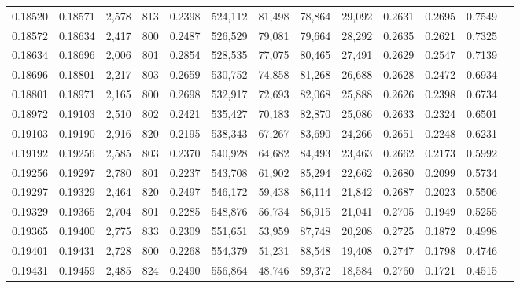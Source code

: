 \begin{tabular}{rrrrrrrrrrrrr}
0.18520 & 0.18571 &  2,578 & 813 &                                     0.2398 & 524,112 &  81,498 &  78,864 &  29,092 & 0.2631 & 0.2695 & 0.7549 \\
0.18572 & 0.18634 &  2,417 & 800 &                                     0.2487 & 526,529 &  79,081 &  79,664 &  28,292 & 0.2635 & 0.2621 & 0.7325 \\
0.18634 & 0.18696 &  2,006 & 801 &                                     0.2854 & 528,535 &  77,075 &  80,465 &  27,491 & 0.2629 & 0.2547 & 0.7139 \\
0.18696 & 0.18801 &  2,217 & 803 &                                     0.2659 & 530,752 &  74,858 &  81,268 &  26,688 & 0.2628 & 0.2472 & 0.6934 \\
0.18801 & 0.18971 &  2,165 & 800 &                                     0.2698 & 532,917 &  72,693 &  82,068 &  25,888 & 0.2626 & 0.2398 & 0.6734 \\
0.18972 & 0.19103 &  2,510 & 802 &                                     0.2421 & 535,427 &  70,183 &  82,870 &  25,086 & 0.2633 & 0.2324 & 0.6501 \\
0.19103 & 0.19190 &  2,916 & 820 &                                     0.2195 & 538,343 &  67,267 &  83,690 &  24,266 & 0.2651 & 0.2248 & 0.6231 \\
0.19192 & 0.19256 &  2,585 & 803 &                                     0.2370 & 540,928 &  64,682 &  84,493 &  23,463 & 0.2662 & 0.2173 & 0.5992 \\
0.19256 & 0.19297 &  2,780 & 801 &                                     0.2237 & 543,708 &  61,902 &  85,294 &  22,662 & 0.2680 & 0.2099 & 0.5734 \\
0.19297 & 0.19329 &  2,464 & 820 &                                     0.2497 & 546,172 &  59,438 &  86,114 &  21,842 & 0.2687 & 0.2023 & 0.5506 \\
0.19329 & 0.19365 &  2,704 & 801 &                                     0.2285 & 548,876 &  56,734 &  86,915 &  21,041 & 0.2705 & 0.1949 & 0.5255 \\
0.19365 & 0.19400 &  2,775 & 833 &                                     0.2309 & 551,651 &  53,959 &  87,748 &  20,208 & 0.2725 & 0.1872 & 0.4998 \\
0.19401 & 0.19431 &  2,728 & 800 &                                     0.2268 & 554,379 &  51,231 &  88,548 &  19,408 & 0.2747 & 0.1798 & 0.4746 \\
0.19431 & 0.19459 &  2,485 & 824 &                                     0.2490 & 556,864 &  48,746 &  89,372 &  18,584 & 0.2760 & 0.1721 & 0.4515 \\

\end{tabular}
